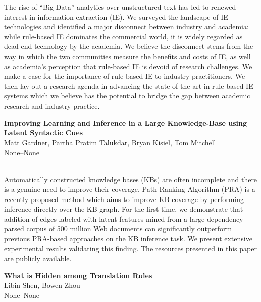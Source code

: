 \documentclass[twoside,makeidx]{book}
\begin{document}
\nopagebreak%
\noindent%
{\small The rise of ``Big Data'' analytics over unstructured text has led to renewed interest in information extraction (IE). We surveyed the landscape of IE technologies and identified a major disconnect between industry and academia: while rule-based IE dominates the commercial world, it is widely regarded as dead-end technology by the academia. We believe the disconnect stems from the way in which the two communities measure the benefits and costs of IE, as well as academia's perception that rule-based IE is devoid of research challenges. We make a case for the importance of rule-based IE to industry practitioners. We then lay out a research agenda in advancing the state-of-the-art in rule-based IE systems which we believe has the potential to bridge the gap between academic research and industry practice.}
\par\vspace{2em}\noindent%
\begin{minipage}{\linewidth}%
\begin{center}
\textbf{\normalsize Improving Learning and Inference in a Large Knowledge-Base using Latent Syntactic Cues}\\
\normalsize  Matt Gardner,  Partha Pratim Talukdar,  Bryan Kisiel,  Tom Mitchell\\
{\small None--None}\\
\end{center}
\end{minipage}\\[0.5em]
\nopagebreak%
\noindent%
{\small Automatically constructed knowledge bases (KBs) are often incomplete and there is a genuine need to improve their coverage. Path Ranking Algorithm (PRA) is a recently proposed method which aims to improve KB coverage by performing inference directly over the KB graph. For the first time, we demonstrate that addition of edges labeled with latent features mined from a large dependency parsed corpus of 500 million Web documents can significantly outperform previous PRA-based approaches on the KB inference task. We present extensive experimental results validating this finding. The resources presented in this paper are publicly available.}
\par\vspace{2em}\noindent%
\begin{minipage}{\linewidth}%
\begin{center}
\textbf{\normalsize What is Hidden among Translation Rules}\\
\normalsize  Libin Shen,  Bowen Zhou\\
{\small None--None}\\
\end{center}
\end{minipage}\\[0.5em]
\end{document}
